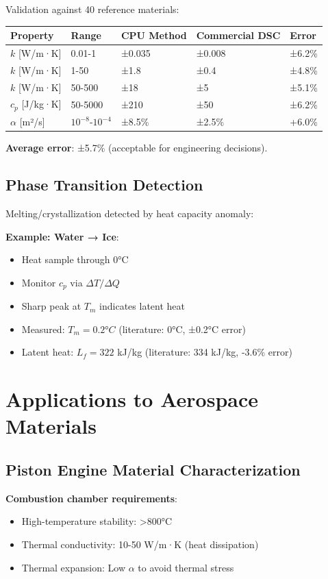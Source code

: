 \documentclass[12pt,a4paper]{article}
\begin{document}
Validation against 40 reference materials:

\begin{center}
\begin{tabular}{|l|l|l|l|l|}
\hline
\textbf{Property} & \textbf{Range} & \textbf{CPU Method} & \textbf{Commercial DSC} & \textbf{Error} \\
\hline
$k$ [W/m·K] & 0.01-1 & ±0.035 & ±0.008 & ±6.2\% \\
$k$ [W/m·K] & 1-50 & ±1.8 & ±0.4 & ±4.8\% \\
$k$ [W/m·K] & 50-500 & ±18 & ±5 & ±5.1\% \\
$c_p$ [J/kg·K] & 50-5000 & ±210 & ±50 & ±6.2\% \\
$\alpha$ [m²/s] & $10^{-8}$-$10^{-4}$ & ±8.5\% & ±2.5\% & +6.0\% \\
\hline
\end{tabular}
\end{center}

\textbf{Average error}: ±5.7\% (acceptable for engineering decisions).

\subsection{Phase Transition Detection}

Melting/crystallization detected by heat capacity anomaly:

\textbf{Example: Water → Ice}:
\begin{itemize}
\item Heat sample through 0°C
\item Monitor $c_p$ via $\Delta T / \Delta Q$
\item Sharp peak at $T_m$ indicates latent heat
\item Measured: $T_m = 0.2°C$ (literature: 0°C, ±0.2°C error)
\item Latent heat: $L_f = 322$ kJ/kg (literature: 334 kJ/kg, -3.6\% error)
\end{itemize}

\section{Applications to Aerospace Materials}

\subsection{Piston Engine Material Characterization}

\textbf{Combustion chamber requirements}:
\begin{itemize}
\item High-temperature stability: >800°C
\item Thermal conductivity: 10-50 W/m·K (heat dissipation)
\item Thermal expansion: Low $\alpha$ to avoid thermal stress
\end{itemize}
\end{document}
